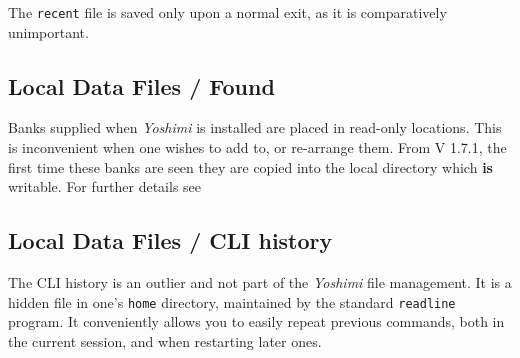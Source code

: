    The \texttt{recent} file is saved only upon a normal exit, as it is
   comparatively unimportant.

\subsection{Local Data Files / Found}
\label{subsec:local_data_found}
   Banks supplied when \textsl{Yoshimi} is installed are placed in read-only
   locations. This is inconvenient when one wishes to add to, or re-arrange
   them. From V 1.7.1, the first time these banks are seen they are copied into
   the local directory which \textbf{is} writable. For further details see

\subsection{Local Data Files / CLI history}
\label{subsec:local_data_cli_history}
   The CLI history is an outlier and not part of the \textsl{Yoshimi} file
   management. It is a hidden file in one's \texttt{home} directory, maintained
   by the standard \texttt{readline} program.
   It conveniently allows you to easily repeat previous commands, both in the
   current session, and when restarting later ones.


